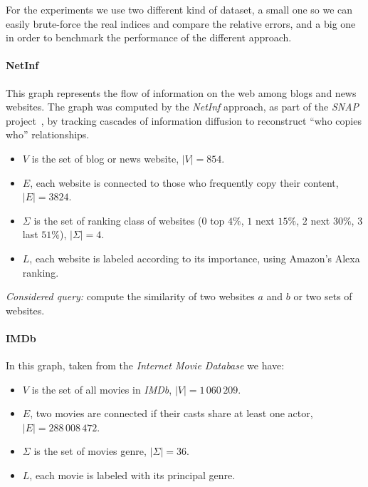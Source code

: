     For the experiments we use two different kind of dataset, a small one so we can easily brute-force the real indices and compare the relative errors, and a big one in order to benchmark the performance of the different approach.
    
    \paragraph*{NetInf} This graph represents the flow of information on the web among blogs and news websites. The graph was computed by the \textit{NetInf} approach, as part of the \textit{SNAP} project~\cite{netinf}, by tracking cascades of information diffusion to reconstruct ``who copies who'' relationships.
    
    \begin{itemize}
    	\item $V$ is the set of blog or news website, $|V| = 854$.
    	\item $E$, each website is connected to those who frequently copy their content, $|E| = 3824$.
    	\item $\Sigma$ is the set of ranking class of websites ($0$ top $4\%$, $1$ next $15\%$, $2$ next $30\%$, $3$ last $51\%$), $|\Sigma| = 4$.
    	\item $L$, each website is labeled according to its importance, using Amazon's Alexa ranking\cite{alexarank}.
    \end{itemize}

    
    \textsl{Considered query:} compute the similarity of two websites $a$ and $b$ or two sets of websites.
    
    \paragraph*{IMDb} In this graph, taken from the \textit{Internet Movie Database}\cite{imdb} we have:
    
    \begin{itemize}
    	\item $V$ is the set of all movies in \textit{IMDb},  $|V| = 1\,060\,209$.
		\item $E$, two movies are connected if their casts share at least one actor, $|E| = 288\,008\,472$.
		\item $\Sigma$ is the set of movies genre, $|\Sigma| = 36$.
		\item $L$, each movie is labeled with its principal genre.
    \end{itemize}
    

